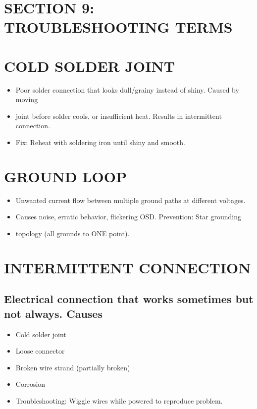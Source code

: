 \documentclass[11pt,letterpaper]{article}
\begin{document}
\section{SECTION 9: TROUBLESHOOTING TERMS}

\section{COLD SOLDER JOINT}

\begin{itemize}
  \item Poor solder connection that looks dull/grainy instead of shiny. Caused by moving
  \item joint before solder cools, or insufficient heat. Results in intermittent connection.
  \item Fix: Reheat with soldering iron until shiny and smooth.
\end{itemize}

\section{GROUND LOOP}

\begin{itemize}
  \item Unwanted current flow between multiple ground paths at different voltages.
  \item Causes noise, erratic behavior, flickering OSD. Prevention: Star grounding
  \item topology (all grounds to ONE point).
\end{itemize}

\section{INTERMITTENT CONNECTION}

\subsection{Electrical connection that works sometimes but not always. Causes}

\begin{itemize}
  \item Cold solder joint
  \item Loose connector
  \item Broken wire strand (partially broken)
  \item Corrosion
  \item Troubleshooting: Wiggle wires while powered to reproduce problem.
\end{itemize}
\end{document}
